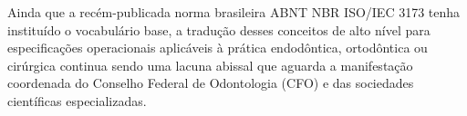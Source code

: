 
Ainda que a recém-publicada norma brasileira ABNT NBR ISO/IEC 3173 \cite{abinc2026brasil} tenha instituído o vocabulário base, a tradução desses conceitos de alto nível para especificações operacionais aplicáveis à prática endodôntica, ortodôntica ou cirúrgica continua sendo uma lacuna abissal que aguarda a manifestação coordenada do Conselho Federal de Odontologia (CFO) e das sociedades científicas especializadas.
